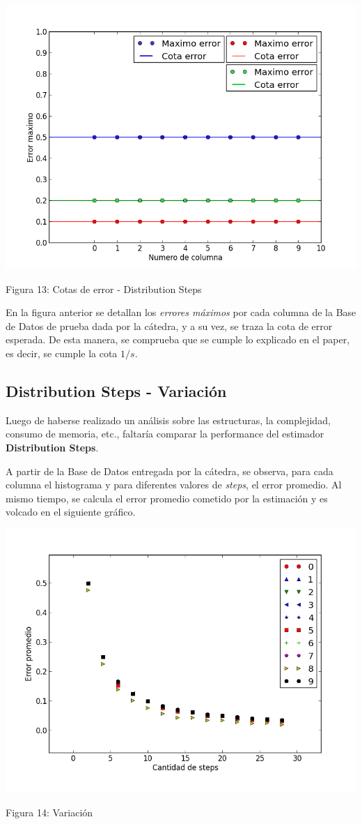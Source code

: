 \documentclass[10pt, a4paper,english,spanish,hidelinks]{article}
\begin{document}
\centerline{  \includegraphics[scale=0.7]{./imagenes/ejc2_cota_juntos.png}}
\centerline{Figura 13: Cotas de error - Distribution Steps}


En la figura anterior se detallan los \textit{errores máximos} por cada columna de la Base de Datos de prueba dada por la cátedra, y a su vez, se traza la cota de error esperada.
De esta manera, se comprueba que se cumple lo explicado en el paper, es decir, se cumple la cota $1/s$.


\subsection{Distribution Steps - Variación}

Luego de haberse realizado un análisis sobre las estructuras, la complejidad, consumo de memoria, etc., faltaría comparar la performance del estimador \textbf{Distribution Steps}.

A partir de la Base de Datos entregada por la cátedra, se observa, para cada columna el histograma y para diferentes valores de \textit{steps}, el error promedio. Al mismo tiempo, se calcula el error promedio cometido por la estimación y es volcado en el siguiente gráfico.

\centerline{  \includegraphics[scale=0.7]{./imagenes/ejc2_variacion.png}}
\centerline{Figura 14: Variación}
\end{document}
